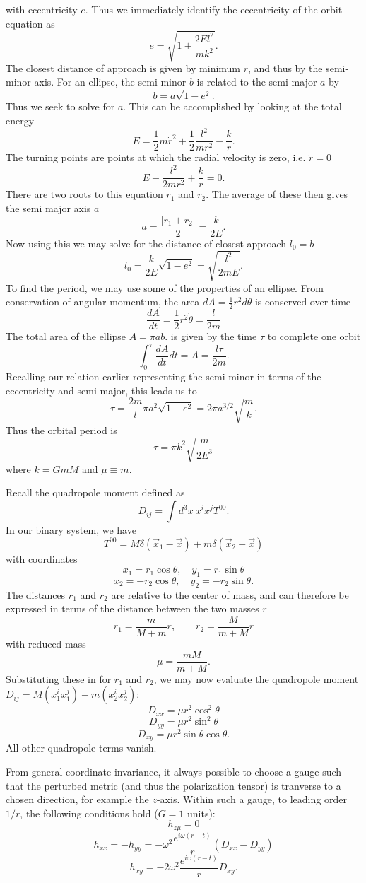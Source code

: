 \documentclass[10pt,letterpaper]{article}
\begin{document}
with eccentricity $e$. Thus we immediately identify the eccentricity of the orbit equation as
\[
	\boxed{e = \sqrt{1+\frac{2El^2}{mk^2}}}.
\]
The closest distance of approach is given by minimum $r$, and thus by the semi-minor axis. For an ellipse, the semi-minor $b$ is related to the semi-major $a$ by
\[
	b = a\sqrt{1-e^2}.
\]	
Thus we seek to solve for $a$. This can be accomplished by looking at the total energy 
\[
	E = \frac12 m\dot r^2 + \frac12 \frac{l^2}{mr^2} -\frac{k}{r}.
\]
The turning points are points at which the radial velocity is zero, i.e. $\dot r =0$
\[
	E -\frac{l^2}{2mr^2}+\frac kr = 0.
\]
There are two roots to this equation $r_1$ and $r_2$. The average of these then gives the semi major axis $a$
\[
	a = \frac{|r_1+r_2|}{2} = \frac{k}{2E}.
\]
Now using this we may solve for the distance of closest approach $l_0 = b$
\[
	\boxed{l_0 = \frac{k}{2E}\sqrt{1-e^2} = \sqrt{\frac{l^2}{2mE}}}.
\]
To find the period, we may use some of the properties of an ellipse. From conservation of angular momentum, the area $dA = \frac12 r^2 d\theta$ is conserved over time
\[
	\frac{dA}{dt} = \frac12 r^2\dot\theta = \frac{l}{2m}
\]
The total area of the ellipse $A = \pi ab$. is given by the time $\tau$ to complete one orbit
\[
	\int_0^\tau \frac{dA}{dt}dt = A = \frac{l\tau}{2m}.
\]
Recalling our relation earlier representing the semi-minor in terms of the eccentricity and semi-major, this leads us to
\[
	\tau = \frac{2m}{l}\pi a^2\sqrt{1-e^2} = 2\pi a^{3/2}\sqrt{\frac mk}.
\]
Thus the orbital period is
\[
	\boxed{\tau = \pi k^2 \sqrt{\frac{m}{2E^3}}}
\]
where $k =GmM$ and $\mu\equiv m$. 
\item
Recall the quadropole moment defined as
\[
	D_{ij} = \int d^3x\ x^i x^j T^{00}.
\]
In our binary system, we have
\[
	T^{00} = M\delta(\vec x_1 - \vec x) + m\delta(\vec x_2 - \vec x)
\]
with coordinates
\[
	x_1 = r_1\cos\theta,\quad y_1 = r_1\sin\theta
\]
\[
	x_2 = -r_2\cos\theta,\quad y_2 = -r_2\sin\theta.
\]
The distances $r_1$ and $r_2$ are relative to the center of mass, and can therefore be expressed in terms of the distance between the two masses $r$
\[
	r_1 = \frac{ m}{M+m}r,\qquad r_2 = \frac{M}{m+M}r
\]
with reduced mass
\[
	\mu = \frac{mM}{m+M}.
\]
Substituting these in for $r_1$ and $r_2$, we may now evaluate the quadropole moment $D_{ij} = M(x_1^i x_1^j) + m(x_2^i x_2^j)$:
\[
	D_{xx} = \mu r^2\cos^2\theta
\]
\[
	D_{yy} = \mu r^2 \sin^2\theta
\]
\[
	D_{xy} = \mu r^2 \sin\theta\cos\theta.
\]
All other quadropole terms vanish. \\
\item
From general coordinate invariance, it always possible to choose a gauge such that the perturbed metric (and thus the polarization tensor) is tranverse to a chosen direction,  for example the $z$-axis. Within such a gauge, to leading order $1/r$,  the following conditions hold ($G=1$ units):
\[
	h_{z\mu} = 0
\]
\[
	h_{xx} = -h_{yy} = -\omega^2\frac{e^{i\omega( r-t)}}{r}(D_{xx}-D_{yy})
\]
\[
	h_{xy} = -2\omega^2\frac{e^{i\omega(r-t)}}{r}D_{xy}.
\]
\end{document}

